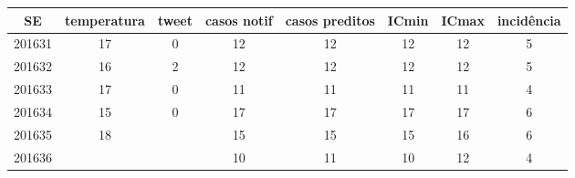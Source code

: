 \begin{tabular}{c|ccccccc}
  \hline
SE & temperatura & tweet & casos notif & casos preditos & ICmin & ICmax & incidência \\ 
  \hline
201631 & 17 & 0 & 12 & 12 & 12 & 12 & 5 \\ 
  201632 & 16 & 2 & 12 & 12 & 12 & 12 & 5 \\ 
  201633 & 17 & 0 & 11 & 11 & 11 & 11 & 4 \\ 
  201634 & 15 & 0 & 17 & 17 & 17 & 17 & 6 \\ 
  201635 & 18 &  & 15 & 15 & 15 & 16 & 6 \\ 
  201636 &  &  & 10 & 11 & 10 & 12 & 4 \\ 
   \hline
\end{tabular}
